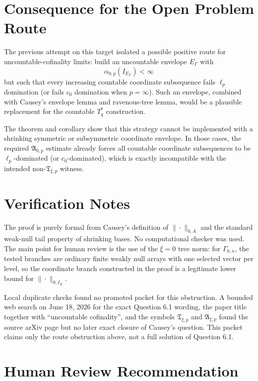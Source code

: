\documentclass[11pt]{article}
\begin{document}
\section*{Consequence for the Open Problem Route}

The previous attempt on this target isolated a possible positive route for
uncountable-cofinality limits: build an uncountable envelope $E_\Gamma$ with
\[
  \alpha_{0,p}(I_{E_\Gamma})<\infty
\]
but such that every increasing countable coordinate subsequence fails
$\ell_p$ domination (or fails $c_0$ domination when $p=\infty$).  Such an
envelope, combined with Causey's envelope lemma and ravenous-tree lemma,
would be a plausible replacement for the countable $T_q^*$ construction.

The theorem and corollary show that this strategy cannot be implemented with
a shrinking symmetric or subsymmetric coordinate envelope.  In those cases,
the required $\mathfrak{A}_{0,p}$ estimate already forces all countable
coordinate subsequences to be $\ell_p$-dominated (or $c_0$-dominated), which
is exactly incompatible with the intended non-$\mathfrak{T}_{\xi,p}$ witness.

\section*{Verification Notes}

The proof is purely formal from Causey's definition of
$\|\cdot\|_{0,A}$ and the standard weak-null tail property of shrinking
bases.  No computational checker was used.  The main point for human review is
the use of the $\xi=0$ tree norm: for $\Gamma_{0,n}$, the tested branches are
ordinary finite weakly null arrays with one selected vector per level, so the
coordinate branch constructed in the proof is a legitimate lower bound for
$\|\cdot\|_{0,I_E}$.

Local duplicate checks found no promoted packet for this obstruction.  A
bounded web search on June 18, 2026 for the exact Question 6.1 wording, the
paper title together with ``uncountable cofinality'', and the symbols
$\mathfrak{T}_{\xi,p}$ and $\mathfrak{A}_{\xi,p}$ found the source arXiv page
but no later exact closure of Causey's question.  This packet claims only the
route obstruction above, not a full solution of Question 6.1.

\section*{Human Review Recommendation}
\end{document}
